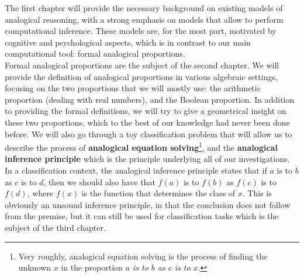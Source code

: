 The first chapter will provide the necessary background on existing
models of analogical reasoning, with a strong emphasis on models that allow to
perform computational inference. These models are, for the most part, motivated
by cognitive and psychological aspects, which is in contrast to our main
computational tool: formal analogical proportions.\\

Formal analogical proportions are the subject of the second chapter. We will
provide the definition of analogical proportions in various algebraic settings,
focusing on the two proportions that we will mostly use: the arithmetic
proportion (dealing with real numbers), and the Boolean proportion. In addition
to providing the formal definitions, we will try to give a geometrical insight
on these two proportions, which to the best of our knowledge had never been
done before. We will also go through a toy classification problem that will
allow us to describe the process of \textbf{analogical equation
solving}\footnote{Very roughly, analogical equation solving is the process of
finding the unknown $x$ in the proportion \textit{$a$ is to $b$ as $c$ is to
$x$}.}, and the \textbf{analogical inference principle} which is the principle
underlying all of our investigations. In a classification context, the
analogical inference principle states that if $a$ is to $b$ as $c$ is to $d$,
then we should also have that $f(a)$ is to $f(b)$ as $f(c)$ is to $f(d)$, where
$f(x)$ is the function that determines the class of $x$. This is obviously an
unsound inference principle, in that the conclusion does not follow from the
premise, but it can still be used for classification tasks which is the subject
of the third chapter.\\

